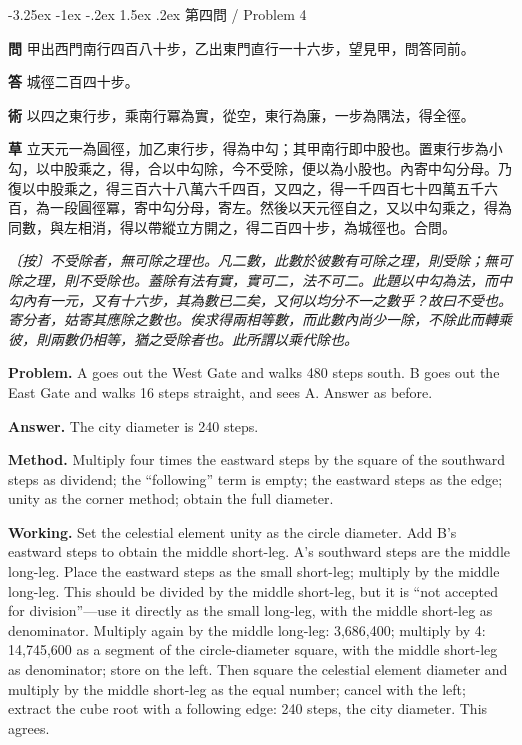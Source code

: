 \documentclass[11pt,a4paper]{article}
\makeatletter
\newlength{\chwidth}
\newlength{\enwidth}
\newcommand{\zh}[1]{{\CJKfamily{sf}#1}}
\newenvironment{bilingual}{%
  \noindent
  \begin{minipage}[t]{\chwidth}%
  \small
}{%
  \end{minipage}%
}
\newcommand{\switchcolumn}{%
  \end{minipage}%
  \hfill%
  \begin{minipage}[t]{\enwidth}%
  \small
}
\renewcommand{\subsubsection}{\@startsection{subsubsection}{3}{\z@}%
  {-3.25ex \@plus -1ex \@minus -.2ex}%
  {1.5ex \@plus .2ex}%
  {\normalfont\normalsize\bfseries\color{sectioncolor}}}
\makeatother
\begin{document}
\subsubsection{\zh{第四問} / Problem 4}

\begin{bilingual}
\noindent\textbf{\zh{問}} \zh{甲出西門南行四百八十步，乙出東門直行一十六步，望見甲，問答同前。}

\vspace{0.2cm}
\noindent\textbf{\zh{答}} \zh{城徑二百四十步。}

\vspace{0.2cm}
\noindent\textbf{\zh{術}} \zh{以四之東行步，乘南行冪為實，從空，東行為廉，一步為隅法，得全徑。}

\vspace{0.2cm}
\noindent\textbf{\zh{草}} \zh{立天元一為圓徑，加乙東行步，得為中勾；其甲南行即中股也。置東行步為小勾，以中股乘之，得，合以中勾除，今不受除，便以為小股也。內寄中勾分母。乃復以中股乘之，得三百六十八萬六千四百，又四之，得一千四百七十四萬五千六百，為一段圓徑冪，寄中勾分母，寄左。然後以天元徑自之，又以中勾乘之，得為同數，與左相消，得以帶縱立方開之，得二百四十步，為城徑也。合問。}

\vspace{0.2cm}
\noindent\textit{\zh{〔按〕不受除者，無可除之理也。凡二數，此數於彼數有可除之理，則受除；無可除之理，則不受除也。蓋除有法有實，實可二，法不可二。此題以中勾為法，而中勾內有一元，又有十六步，其為數已二矣，又何以均分不一之數乎？故曰不受也。寄分者，姑寄其應除之數也。俟求得兩相等數，而此數內尚少一除，不除此而轉乘彼，則兩數仍相等，猶之受除者也。此所謂以乘代除也。}}

\switchcolumn

\noindent\textbf{Problem.} A goes out the West Gate and walks 480 steps south. B goes out the East Gate and walks 16 steps straight, and sees A. Answer as before.

\vspace{0.2cm}
\noindent\textbf{Answer.} The city diameter is 240 steps.

\vspace{0.2cm}
\noindent\textbf{Method.} Multiply four times the eastward steps by the square of the southward steps as dividend; the ``following'' term is empty; the eastward steps as the edge; unity as the corner method; obtain the full diameter.

\vspace{0.2cm}
\noindent\textbf{Working.} Set the celestial element unity as the circle diameter. Add B's eastward steps to obtain the middle short-leg. A's southward steps are the middle long-leg. Place the eastward steps as the small short-leg; multiply by the middle long-leg. This should be divided by the middle short-leg, but it is ``not accepted for division''---use it directly as the small long-leg, with the middle short-leg as denominator. Multiply again by the middle long-leg: 3,686,400; multiply by 4: 14,745,600 as a segment of the circle-diameter square, with the middle short-leg as denominator; store on the left. Then square the celestial element diameter and multiply by the middle short-leg as the equal number; cancel with the left; extract the cube root with a following edge: 240 steps, the city diameter. This agrees.


\end{bilingual}
\end{document}
